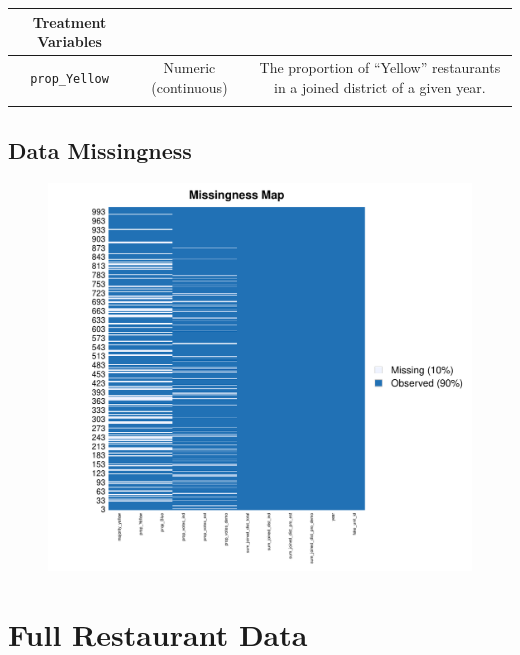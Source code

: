 \documentclass[letterpaper, 12pt]{article}
\begin{document}
\begin{appendices}
\begin{table}[h!]
\begin{tabularx}{\textwidth}{CCC}
\midrule
\textbf{Treatment Variables} & \phantom{} & \phantom{}\\
\midrule
\texttt{prop\_Yellow} & Numeric (continuous) & The proportion of ``Yellow'' restaurants in a joined district of a given year.  \\
{} &  &   \\
\bottomrule
\end{tabularx}
\end{table}
\endgroup{}


\subsection{Data Missingness}
\clearpage
\begin{figure}[!h]
    \centering
    \includegraphics[scale=0.7]{Visuals/missingness.pdf}
    \label{fig:my_label}
\end{figure}






\section{Full Restaurant Data} \label{appendix;full_restaurant}


\end{appendices}
\end{document}
